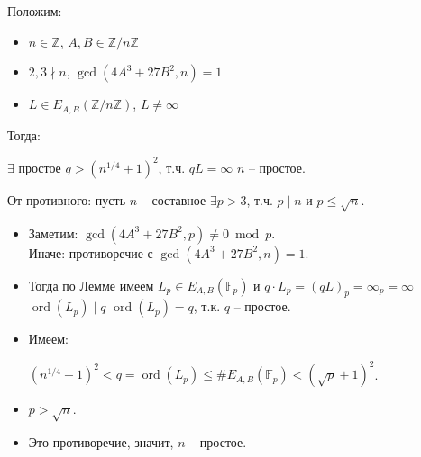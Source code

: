 \documentclass{beamer}
\begin{document}
\begin{frame}
   \begin{center}
	\begin{tcolorbox}[enhanced,hbox,colback=title-and-section-color!5,colframe=title-and-section-color!120,title= Теорема (Критерий простоты),center title]
		\begin{varwidth}{\textwidth}
			\label{t3}
			Положим:
			\begin{itemize}
				\item $n \in \mathbb{Z}$, $A, B \in \mathbb{Z}/n\mathbb{Z}$
				\item $2,3 \nmid n$, $\gcd(4A^3 + 27B^2, n)=1$
				\item $L \in E_{A,B}(\mathbb{Z}/n\mathbb{Z})$, $L\neq \infty$
			\end{itemize}
			 \vspace{0.5em}
			 Тогда:
			 
			 \vspace{0.1em}
				$\exists$ простое $q > (n^{1/4} + 1)^2$, т.ч. $qL = \infty$ \structure{$\implies$} $n$ -- простое.
		\end{varwidth}
	\end{tcolorbox}	
\end{center}
\end{frame}

\begin{frame}
\structure{$\triangleleft$}
От противного: пусть $n$ -- составное \structure{$\Rightarrow$} $\exists p > 3$, т.ч. $p \mid n$ и $p \leq \sqrt{n}$.
\begin{itemize}
    \item Заметим: $\gcd(4A^3 + 27B^2, p) \neq 0 \bmod p$.\\Иначе: противоречие с $\gcd(4A^3 + 27B^2, n) = 1$.
    \item Тогда по Лемме имеем $L_p \in E_{A,B}(\mathbb{F}_p)$ и $q\cdot L_p = (qL)_p = \infty_p = \infty$ \structure{$\Rightarrow$} $\operatorname{ord}(L_p) \mid q$ \structure{$\Rightarrow$} $\operatorname{ord}(L_p) = q$, т.к. $q$ -- простое.
    \item Имеем:

    $(n^{1/4} + 1)^2 < q = \operatorname{ord}(L_p) \leq \#E_{A,B}(\mathbb{F}_p) < (\sqrt{p} + 1)^2$.
    \item \structure{$\implies$} $p > \sqrt{n}$.
    \item Это противоречие, значит, $n$ -- простое. \structure{$\triangleright$}
\end{itemize}
\end{frame}
\end{document}
